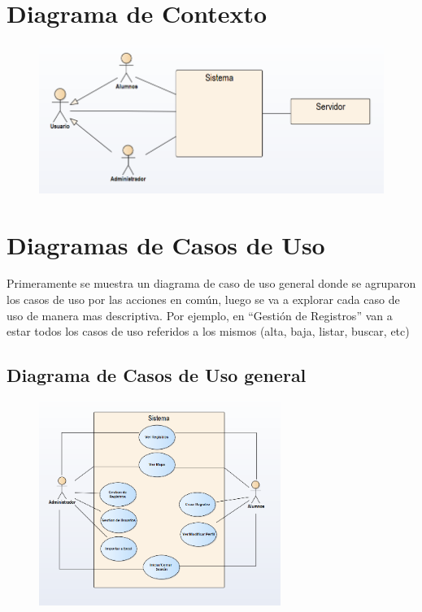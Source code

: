 	\section{Diagrama de Contexto}
		\begin{figure}[H]
		\centering
			
			\includegraphics[width=1\textwidth]{imagenes/analisis/diagrama-contexto.png}
			\label{fig:casos-de-uso}
		\end{figure}

	\section{Diagramas de Casos de Uso}
		Primeramente se muestra un diagrama de caso de uso general donde se agruparon los casos de uso por las acciones en común, luego se va a explorar cada caso de uso de manera mas descriptiva.
		Por ejemplo, en ``Gestión de Registros'' van a estar todos los casos de uso referidos a los mismos (alta, baja, listar, buscar, etc)

		\subsection{Diagrama de Casos de Uso general}
			\begin{figure}[H]
			\centering
				\includegraphics[width=0.7\textwidth]{imagenes/analisis/casos-uso-general.png}
				\label{fig:casos-de-uso}
			\end{figure}

